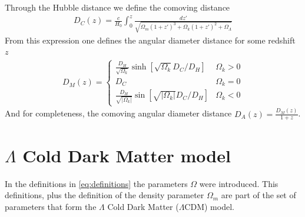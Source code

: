 Through the Hubble distance we define the comoving distance 
\begin{align}
	D_C(z) = \frac{c}{H_0}\int_{0}^{z} \frac{dz'}{\sqrt{\Omega_m(1+z')^3 + \Omega_k(1+z')^2 + \Omega_\Lambda} } 
\end{align}
From this expression one defines the angular diameter distance for some redshift $z$
\begin{align}
	D_M(z) = \begin{cases}
		\frac{D_H}{ \sqrt{\Omega_k} }\sinh \left[ \sqrt{\Omega_k} D_C /D_H \right]  	 &\Omega_k >0\\
		D_C& \Omega_k =  0\\
		\frac{D_H}{\sqrt{|\Omega_k|}} \sin \left[ \sqrt{|\Omega_k|} D_C /D_H \right]  	 &\Omega_k <0
		\label{eq:DA-definition}
	\end{cases}
\end{align}
And for completeness, the comoving angular diameter distance $D_A(z) = \frac{D_M(z) }{1+z}$.

\section{$\Lambda$ Cold Dark Matter model}
\label{sec:LCDM}

In the definitions in \eqref{eq:definitions} the parameters $\Omega$ were introduced. This definitions, plus the definition of the density parameter $\Omega_m$ are part of the set of parameters that form the $\Lambda$ Cold Dark Matter ($\Lambda$CDM) model. \\

